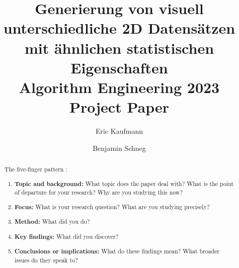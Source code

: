 \documentclass[sigconf]{acmart}
\begin{document}
\title[Generierung von visuell unterschiedlichen 2D Datensätzen mit ähnlichen statistischen Eigenschaften ]{Generierung von visuell unterschiedliche 2D Datensätzen mit ähnlichen statistischen Eigenschaften\\\large Algorithm Engineering 2023 Project Paper}


\author{Eric Kaufmann}

\author{Benjamin Schneg}

\begin{abstract}

The five-finger pattern \cite{macgilchrist2014}:
\begin{enumerate}
\item \textbf{Topic and background:} What topic does the paper deal with? What is the point of departure for your research? Why are you studying this now?
\item \textbf{Focus:} What is your research question? What are you studying precisely?
\item \textbf{Method:} What did you do?
\item \textbf{Key findings:} What did you discover?
\item \textbf{Conclusions or implications:} What do these findings mean? What broader issues do they speak to?
\end{enumerate}


\end{abstract}



\maketitle
\end{document}
